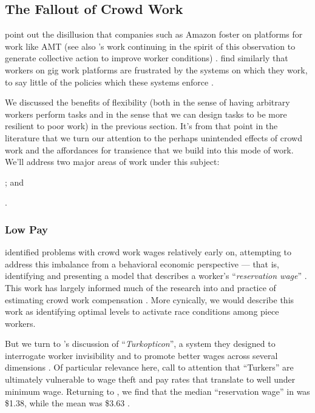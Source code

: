 \documentclass{sigchi}
\begin{document}
\subsection{The Fallout of Crowd Work}\label{sec:Fallout}
\citeauthor{turkopticon} point out the disillusion that companies such as Amazon foster on platforms for work like AMT
(see also \citeauthor{dynamo}'s work
continuing in the spirit of this observation to generate collective action to improve worker conditions)
\cite{turkopticon,dynamo}.
\citeauthor{uberAlgorithm}
find similarly that workers on gig work platforms are frustrated by the systems on which they work,
to say little of the policies which these systems enforce
\cite{uberAlgorithm}.

We discussed the benefits of flexibility
(both in the sense of having arbitrary workers perform tasks and
in the sense that we can design tasks to be more resilient to poor work)
in the previous section.
It's from that point in the literature that we turn our attention to
the perhaps unintended effects of crowd work
and the affordances for transience that we build into this mode of work.
We'll address two major areas of work under this subject:
\begin{inlinelist}
\item {}; and
\item {}.
\end{inlinelist}

\subsubsection{Low Pay}\label{sec:lowPay}
\citeauthor{laborEconomicsOfCrowdsourcingHorton}
identified problems with crowd work wages relatively early on,
attempting to address this imbalance from a behavioral economic perspective ---
that is, identifying and presenting a model that describes a worker's
``\textit{reservation wage}''
\cite{laborEconomicsOfCrowdsourcingHorton}.
This work has largely informed much of the research into and practice of estimating crowd work compensation
\cite{incentivesShaw,paolacci2010running}.
More cynically,
we would describe this work as identifying optimal levels to activate race conditions among piece workers.

But we turn to \citeauthor{turkopticon}'s discussion of ``\textit{Turkopticon}'',
a system they designed to interrogate worker invisibility and to promote better wages across several dimensions
\cite{turkopticon}.
Of particular relevance here,
\citeauthor{turkopticon} call to attention that ``Turkers'' are ultimately vulnerable to
wage theft and
pay rates that translate to well under minimum wage.
Returning to \citeauthor{laborEconomicsOfCrowdsourcingHorton},
we find that the median ``reservation wage'' in \citeyear{laborEconomicsOfCrowdsourcingHorton}
was \$1.38, while the mean was \$3.63
\cite{laborEconomicsOfCrowdsourcingHorton}.
\end{document}
